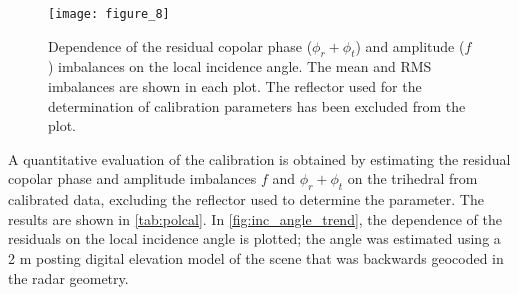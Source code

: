 \begin{figure*}[ht!]
	\centering
	\texttt{[image: figure\_8]}
	\caption{Dependence of the residual copolar phase ($\phi_r + \phi_t$) and amplitude  ($f$) imbalances on the local incidence angle. The mean and RMS imbalances are shown in each plot. The reflector used for the determination of calibration parameters has been excluded from the plot.}
	\label{fig:inc_angle_trend}
\end{figure*}
A quantitative evaluation of the calibration is obtained by estimating the residual copolar phase and amplitude imbalances $f$ and $\phi_r + \phi_t$ on the trihedral from calibrated data, excluding the reflector used to determine the parameter. The results are shown in \autoref{tab:polcal}.
In \autoref{fig:inc_angle_trend}, the dependence of the residuals on the local incidence angle is plotted; the angle was estimated using a 2 m posting digital elevation model of the scene that was backwards geocoded in the radar geometry.